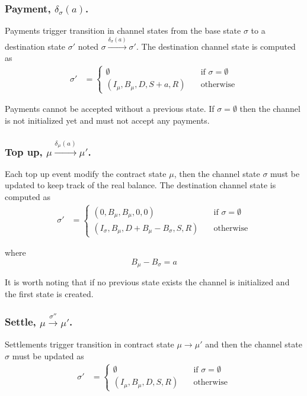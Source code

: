 \documentclass{llncs}
\begin{document}
\subsubsection{Payment, $\delta_\sigma(a)$.} Payments trigger transition in channel states from the base state $\sigma$ to a destination state $\sigma'$ noted $\sigma \xrightarrow{\delta_\sigma(a)} \sigma'$.
The destination channel state is computed as
\begin{equation*}
\begin{split}
  \sigma' &=
  \begin{cases}
      \emptyset & \quad \text{if } \sigma = \emptyset \\
      (I_\mu, B_\mu, D, S+a, R) & \quad \text{otherwise}
  \end{cases}
\end{split}
\end{equation*}

Payments cannot be accepted without a previous state. If $\sigma = \emptyset$ then the channel is not initialized yet and must not accept any payments.

\subsubsection{Top up, $\mu \xrightarrow{\delta_\mu(a)} \mu'$.} Each top up event modify the contract state $\mu$, then the channel state $\sigma$ must be updated to keep track of the real balance. The destination channel state is computed as \begin{equation*}
\begin{split}
  \sigma' &=
  \begin{cases}
      (0, B_\mu, B_\mu, 0, 0) & \quad \text{if } \sigma = \emptyset \\
      (I_\sigma, B_\mu, D + B_\mu - B_\sigma, S, R) & \quad \text{otherwise}
  \end{cases}
\end{split}
\end{equation*}

where
$$B_\mu - B_\sigma = a$$

It is worth noting that if no previous state exists the channel is initialized and the first state is created.

\subsubsection{Settle, $\mu \xrightarrow{\sigma''} \mu'$.} Settlements trigger transition in contract state $\mu \rightarrow \mu'$ and then the channel state $\sigma$ must be updated as
\begin{equation*}
\begin{split}
  \sigma' &=
  \begin{cases}
      \emptyset & \quad \text{if } \sigma = \emptyset \\
      (I_\mu, B_\mu, D, S, R) & \quad \text{otherwise}
  \end{cases}
\end{split}
\end{equation*}
\end{document}
